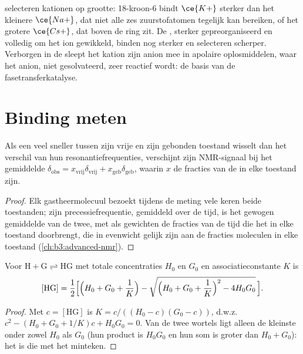  selecteren kationen op grootte: 18-kroon-6 bindt $\ce{K+}$ sterker dan het
kleinere $\ce{Na+}$, dat niet alle zes zuurstofatomen tegelijk kan bereiken, of het grotere $\ce{Cs+}$, dat
boven de ring zit. De , sterker gepreorganiseerd en volledig om
het ion gewikkeld, binden nog sterker en selecteren scherper. Verborgen
in de  sleept het kation zijn anion mee in apolaire
oplosmiddelen, waar het anion, niet gesolvateerd, zeer reactief wordt:
de basis van de fasetransferkatalyse.

\section{Binding meten}

\begin{proposition}\label{prop:b3:supramolecular:fast-exchange}
Als een  veel sneller tussen zijn vrije en zijn gebonden toestand
wisselt dan het verschil van hun resonantiefrequenties, verschijnt zijn
NMR-signaal bij het gemiddelde
$\delta_{\mathrm{obs}} = x_{\mathrm{vrij}}\delta_{\mathrm{vrij}} + x_{\mathrm{geb}}\delta_{\mathrm{geb}}$, waarin $x$ de fracties van de  in elke toestand zijn.
\end{proposition}

\begin{proof}
Elk gastheermolecuul bezoekt tijdens de meting vele keren beide
toestanden; zijn precessiefrequentie, gemiddeld over de tijd, is het
gewogen gemiddelde van de twee, met als gewichten de fracties van de tijd
die het in elke toestand doorbrengt, die in evenwicht gelijk zijn aan de
fracties moleculen in elke toestand (\cref{ch:b3:advanced-nmr}).
\end{proof}

\begin{theorem}\label{thm:b3:supramolecular:isotherm}
Voor $\mathrm{H + G \rightleftharpoons HG}$ met totale concentraties $H_0$ en $G_0$ en associatieconstante $K$ is
\[
  [\mathrm{HG}] = \frac{1}{2}\Bigl[\Bigl(H_0 + G_0 + \frac1K\Bigr) - \sqrt{\Bigl(H_0 + G_0 + \frac1K\Bigr)^2 - 4H_0G_0}\,\Bigr].
\]
\end{theorem}

\begin{proof}
Met $c = [\mathrm{HG}]$ is $K = c/((H_0 - c)(G_0 - c))$, d.w.z.\ $c^2 - (H_0 + G_0 + 1/K)c + H_0G_0 = 0$. Van de twee wortels
ligt alleen de kleinste onder zowel $H_0$ als $G_0$ (hun product is $H_0G_0$ en hun som
is groter dan $H_0 + G_0$): het is die met het minteken.
\end{proof}

